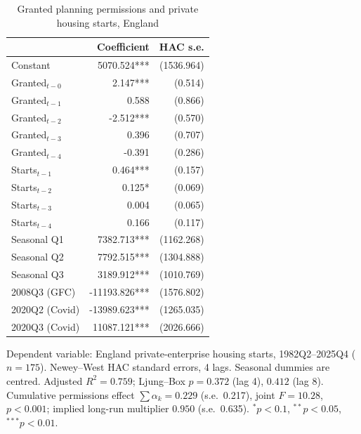 \begin{table}[htbp]
\centering
\caption{Granted planning permissions and private housing starts, England}
\label{tab:planning_starts}
\begin{tabular}{lrr}
\toprule
& Coefficient & HAC s.e. \\
\midrule
Constant & 5070.524*** & (1536.964) \\
Granted$_{t-0}$ & 2.147*** & (0.514) \\
Granted$_{t-1}$ & 0.588 & (0.866) \\
Granted$_{t-2}$ & -2.512*** & (0.570) \\
Granted$_{t-3}$ & 0.396 & (0.707) \\
Granted$_{t-4}$ & -0.391 & (0.286) \\
Starts$_{t-1}$ & 0.464*** & (0.157) \\
Starts$_{t-2}$ & 0.125* & (0.069) \\
Starts$_{t-3}$ & 0.004 & (0.065) \\
Starts$_{t-4}$ & 0.166 & (0.117) \\
Seasonal Q1 & 7382.713*** & (1162.268) \\
Seasonal Q2 & 7792.515*** & (1304.888) \\
Seasonal Q3 & 3189.912*** & (1010.769) \\
2008Q3 (GFC) & -11193.826*** & (1576.802) \\
2020Q2 (Covid) & -13989.623*** & (1265.035) \\
2020Q3 (Covid) & 11087.121*** & (2026.666) \\
\bottomrule
\end{tabular}
\begin{minipage}{\linewidth}\vspace{4pt}\footnotesize Dependent variable: England private-enterprise housing starts, 1982Q2--2025Q4 ($n=175$). Newey--West HAC standard errors, 4 lags. Seasonal dummies are centred. Adjusted $R^2 = 0.759$; Ljung--Box $p = 0.372$ (lag 4), $0.412$ (lag 8). Cumulative permissions effect $\sum\alpha_k = 0.229$ (s.e.\ 0.217), joint $F = 10.28$, $p < 0.001$; implied long-run multiplier $0.950$ (s.e.\ 0.635). $^{*}p<0.1$, $^{**}p<0.05$, $^{***}p<0.01$.\end{minipage}
\end{table}
